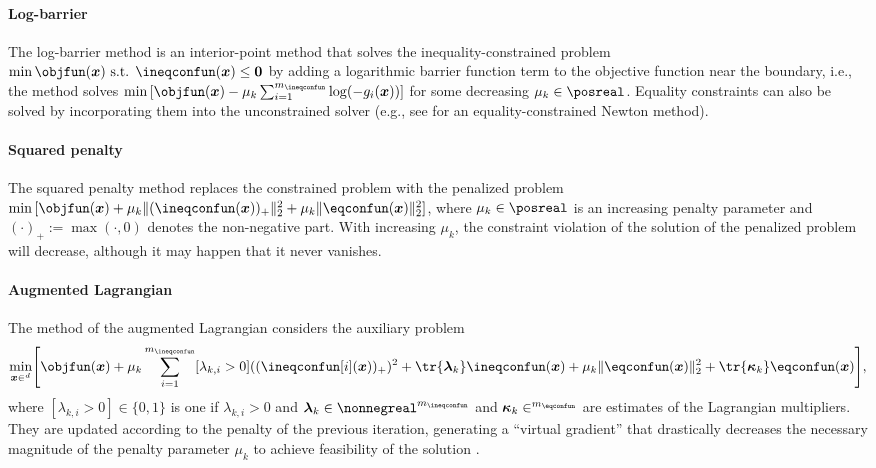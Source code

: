 \paragraph{Log-barrier}

The log-barrier method
is an interior-point method that solves the inequality-constrained problem
$\min \objfun(\*x) \text{ s.t. } \ineqconfun(\*x) \le \*0$ by
adding a logarithmic barrier function term to the objective function
near the boundary, i.e., the method solves
$\min\, [\objfun(\*x) - \mu_k \sum_{i=1}^{m_{\ineqconfun}} \log(-g_i(\*x))]$
for some decreasing $\mu_k \in \posreal$.
Equality constraints can also be solved by incorporating them
into the unconstrained solver (e.g., see \cite{Boyd04Convex}
for an equality-constrained Newton method).

\paragraph{Squared penalty}

The squared penalty method
replaces the constrained problem with the penalized problem
$\min\, [\objfun(\*x) + \mu_k \norm[2]{(\ineqconfun(\*x))_{+}}^2 +
\mu_k \norm[2]{\eqconfun(\*x)}^2]$,
where $\mu_k \in \posreal$ is an increasing penalty parameter and
$(\cdot)_{+} := \max(\cdot, 0)$ denotes the non-negative part.
With increasing $\mu_k$, the constraint violation of the solution of
the penalized problem will decrease, although it may happen
that it never vanishes.

\paragraph{Augmented Lagrangian}

The method of the augmented Lagrangian
considers the auxiliary problem
\begin{equation}
  \min_{\*x \in \real^d} \bracket*{
    \objfun(\*x) + \mu_k \sum_{i=1}^{m_{\ineqconfun}} [\lambda_{k,i} > 0]
    ((\ineqconfun[i](\*x))_{+})^2 + \tr{\*\lambda_k} \ineqconfun(\*x) +
    \mu_k \norm[2]{\eqconfun(\*x)}^2 +
    \tr{\*\kappa_k} \eqconfun(\*x)
  },
\end{equation}
where $[\lambda_{k,i} > 0] \in \{0, 1\}$ is one if $\lambda_{k,i} > 0$ and
$\*\lambda_k \in \nonnegreal^{m_{\ineqconfun}}$ and
$\*\kappa_k \in \real^{m_{\eqconfun}}$ are estimates of the
Lagrangian multipliers.
They are updated according to the penalty of the previous iteration,
generating a ``virtual gradient'' that drastically decreases
the necessary magnitude of the penalty parameter $\mu_k$
to achieve feasibility of the solution \cite{Toussaint15Introduction}.

